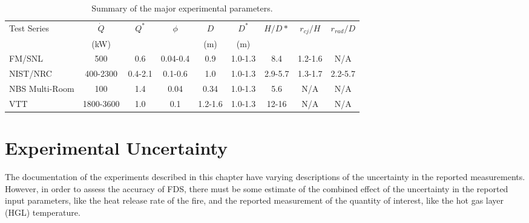 \begin{table}[ht!]
\caption{Summary of the major experimental parameters. }
\begin{center}
\begin{tabular}{|l|c|c|c|c|c|c|c|c|}
\hline
Test Series     & $\dot{Q}$     & $Q^*$     & $\phi$    & $D$       & $D^*$     & $H/D*$    & $r_{cj}/H$    & $r_{rad}/D$       \\ 
                & (kW)          &           &           & (m)       & (m)       &           &               &                   \\ \hline \hline
FM/SNL          & 500           & 0.6       &  0.04-0.4 & 0.9       & 1.0-1.3   &  8.4      &   1.2-1.6     &  N/A              \\ \hline
NIST/NRC        & 400-2300      & 0.4-2.1   &  0.1-0.6  & 1.0       & 1.0-1.3   &  2.9-5.7  &   1.3-1.7     &  2.2-5.7          \\ \hline
NBS Multi-Room  & 100           & 1.4       &  0.04     & 0.34      & 1.0-1.3   &  5.6      &   N/A         &  N/A              \\ \hline
VTT             & 1800-3600     & 1.0       &  0.1      & 1.2-1.6   & 1.0-1.3   &  12-16    &   N/A         &  N/A              \\ \hline
\end{tabular}
\end{center}
\label{Test_Parameters}
\end{table}




\clearpage

\section{Experimental Uncertainty}

The documentation of the experiments described in this chapter have varying descriptions of the uncertainty in the reported measurements.
However, in order to assess the accuracy of FDS, there must be some estimate of the combined effect of the uncertainty in the reported
input parameters, like the heat release rate of the fire, and the reported measurement of the quantity of interest, like the hot gas layer (HGL)
temperature.

